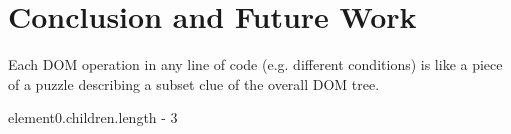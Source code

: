 \section{Conclusion and Future Work}
Each DOM operation in any line of code (e.g. different conditions) is like a piece of a puzzle describing a subset clue of the overall DOM tree.  


element0.children.length - 3 



